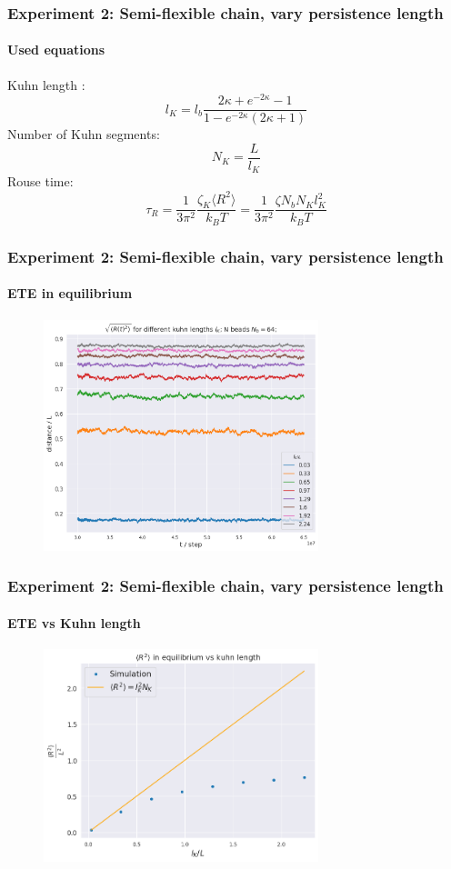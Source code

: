 \documentclass[handout]{beamer}
\newcommand{\mean}[1]{\langle #1 \rangle}
\begin{document}
\begin{frame}
    \frametitle{Experiment 2: Semi-flexible chain, vary persistence length}
    \framesubtitle{Used equations}

    Kuhn length \cite{svaneborg_2020}:
    \begin{equation}
        l_K = l_b \frac{2\kappa + e^{-2 \kappa} - 1}{1-e^{-2\kappa}(2 \kappa + 1)}
    \end{equation}
    Number of Kuhn segments:
    \begin{equation} 
        N_K = \frac{L}{l_K}
    \end{equation}
    Rouse time:
    \begin{equation} \label{eq:tau_R_kuhn}
        \tau_R = \frac{1}{3 \pi^2} \frac{\zeta_{K} \mean{R^2}}{k_B T} = \frac{1}{3 \pi^2} \frac{\zeta N_b N_K l_K^2}{k_B T}
    \end{equation}
\end{frame}


\begin{frame}
    \frametitle{Experiment 2: Semi-flexible chain, vary persistence length}
    \framesubtitle{ETE in equilibrium}

    \begin{figure}[h]
        \includegraphics[width=8cm]{./4-exp-R_equi.png}
    \end{figure}
\end{frame}


\begin{frame}
    \frametitle{Experiment 2: Semi-flexible chain, vary persistence length}
    \framesubtitle{ETE vs Kuhn length}

    \begin{figure}[h]
        \includegraphics[width=8cm]{./4-exp-R_sim_vs_theor.png}
    \end{figure}
\end{frame}
\end{document}
